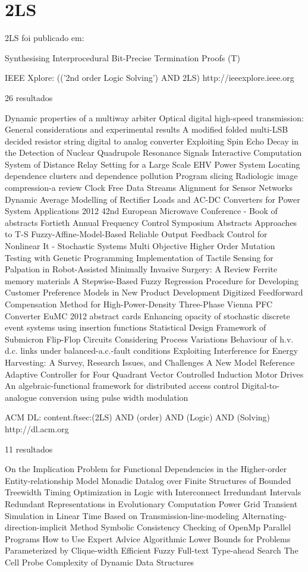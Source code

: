 \section{2LS}

2LS foi publicado em:

Synthesising Interprocedural Bit-Precise Termination Proofs (T)

IEEE Xplore: (('2nd order Logic Solving') AND 2LS)
http://ieeexplore.ieee.org

26 resultados

Dynamic properties of a multiway arbiter
Optical digital high-speed transmission: General considerations and experimental results
A modified folded multi-LSB decided resistor string digital to analog converter
Exploiting Spin Echo Decay in the Detection of Nuclear Quadrupole Resonance Signals
Interactive Computation System of Distance Relay Setting for a Large Scale EHV Power System
Locating dependence clusters and dependence pollution
Program slicing
Radiologic image compression-a review
Clock Free Data Streams Alignment for Sensor Networks
Dynamic Average Modelling of Rectifier Loads and AC-DC Converters for Power System Applications
2012 42nd European Microwave Conference - Book of abstracts
Fortieth Annual Frequency Control Symposium Abstracts
Approaches to T-S Fuzzy-Affine-Model-Based Reliable Output Feedback Control for Nonlinear It - Stochastic Systems
Multi Objective Higher Order Mutation Testing with Genetic Programming
Implementation of Tactile Sensing for Palpation in Robot-Assisted Minimally Invasive Surgery: A Review
Ferrite memory materials
A Stepwise-Based Fuzzy Regression Procedure for Developing Customer Preference Models in New Product Development
Digitized Feedforward Compensation Method for High-Power-Density Three-Phase Vienna PFC Converter
EuMC 2012 abstract cards
Enhancing opacity of stochastic discrete event systems using insertion functions
Statistical Design Framework of Submicron Flip-Flop Circuits Considering Process Variations
Behaviour of h.v. d.c. links under balanced-a.c.-fault conditions
Exploiting Interference for Energy Harvesting: A Survey, Research Issues, and Challenges
A New Model Reference Adaptive Controller for Four Quadrant Vector Controlled Induction Motor Drives
An algebraic-functional framework for distributed access control
Digital-to-analogue conversion using pulse width modulation

ACM DL: content.ftsec:(2LS) AND (order) AND (Logic) AND (Solving)
http://dl.acm.org

11 resultados

On the Implication Problem for Functional Dependencies in the Higher-order Entity-relationship Model
Monadic Datalog over Finite Structures of Bounded Treewidth
Timing Optimization in Logic with Interconnect
Irredundant Intervals
Redundant Representations in Evolutionary Computation
Power Grid Transient Simulation in Linear Time Based on Transmission-line-modeling Alternating-direction-implicit Method
Symbolic Consistency Checking of OpenMp Parallel Programs
How to Use Expert Advice
Algorithmic Lower Bounds for Problems Parameterized by Clique-width
Efficient Fuzzy Full-text Type-ahead Search
The Cell Probe Complexity of Dynamic Data Structures
